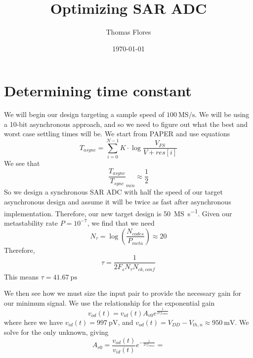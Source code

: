 \documentclass[letterpaper, 12pt, notitlepage]{revtex4-1}
\begin{document}
\title{ Optimizing SAR ADC}
\author{Thomas Flores}
\affiliation{}
\date{\today}
\maketitle

\section{Determining time constant}
We will begin our design targeting a sample speed of $\SI{100}{\mega\siemens\per\second}$. We will be using a 10-bit asynchronous approach, and so we need to figure out what the best and worst case settling times will be. 
We start from PAPER and use equations
\begin{equation}
T_{async}=\sum_{i=0}^{N-1}K\cdot\log\frac{V_{FS}}{V+{res}[i]}
\end{equation}
We see that 
\begin{equation}
\frac{T_{async}}{T_{sync}}_{min}\approx\frac{1}{2}
\end{equation}
So we design a synchronous SAR ADC with half the speed of our target asynchronous design and assume it will be twice as fast after asynchronous implementation. Therefore, our new target design is \SI{50}{\mega\siemens\per\second}.  Given our metastability rate $P=10^{-7}$, we find that we need
\begin{equation}
N_{\tau}=\log\left(\frac{N_{codes}}{P_{meta}}\right)\approx20
\end{equation}
Therefore, 
\begin{equation}
\tau=\frac{1}{2F_sN_{\tau}N_{ck,conf}}
\end{equation}
This means $\tau=\SI{41.67}{\pico\second}$

We then see how we must size the input pair to provide the necessary gain for our minimum signal. We use the relationship for the exponential gain
\begin{equation}
v_{od}(t)=v_{id}(t)A_{v0}e^{\frac{1}{2\tau f_{cmax}}}
\end{equation}
where here we have $v_{id}(t)=\SI{997}{\pico\volt}$, and $v_{od}(t)=V_{DD}-V_{th,n}\approx \SI{950}{\milli\volt}$. We solve for the only unknown, giving
\begin{equation}
A_{v0}=\frac{v_{od}(t)}{v_{id}(t)}e^{-\frac{1}{2\tau f_{cmax}}}=
\end{equation}
\end{document}

